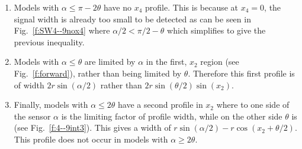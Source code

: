 \begin{enumerate}
\item Models with $\alpha \le \pi - 2\theta$  have no $x_4$ profile. This is because at $x_4 = 0$, the signal width is already too small to be detected as can be seen in Fig.~\ref{f:SW4--9nox4} where $\alpha/2 < \pi/2 - \theta$ which simplifies to give the previous inequality.

\item Models with $\alpha \le \theta$ are limited by $\alpha$ in the first, $x_2$ region (see Fig.~\ref{f:forward}), rather than being limited by $\theta$. Therefore this first profile is of width $2r\sin(\alpha/2)$ rather than $2r\sin(\theta/2)\sin(x_2)$.

\item Finally, models with $\alpha \le 2\theta$ have a second profile in $x_2$ where to one side of the sensor $\alpha$ is the limiting factor of profile width, while on the other side $\theta$ is (see Fig.~\ref{f:4--9int3}). This gives a width of $r\sin(\alpha/2) - r\cos(x_2 + \theta/2)$. This profile does not occur in models with $\alpha \ge 2\theta$.

\end{enumerate}

